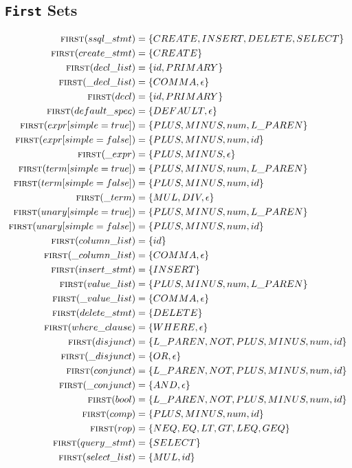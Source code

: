 \documentclass{article}
\begin{document}
\subsection{\texttt{First} Sets}
\begin{align*}
\textsc{first}(ssql\_stmt) & = \{CREATE, INSERT, DELETE, SELECT\} \\
\textsc{first}(create\_stmt) & = \{CREATE\} \\
\textsc{first}(decl\_list) & = \{id, PRIMARY\} \\
\textsc{first}(\_decl\_list) & = \{COMMA, \epsilon\} \\
\textsc{first}(decl) & = \{id, PRIMARY\} \\
\textsc{first}(default\_spec) & = \{DEFAULT, \epsilon\} \\
\textsc{first}(expr[simple=true]) & = \{PLUS, MINUS, num, L\_PAREN\} \\
\textsc{first}(expr[simple=false]) & = \{PLUS, MINUS, num, id\} \\
\textsc{first}(\_expr) & = \{PLUS, MINUS, \epsilon\} \\
\textsc{first}(term[simple=true]) & = \{PLUS, MINUS, num, L\_PAREN\} \\
\textsc{first}(term[simple=false]) & = \{PLUS, MINUS, num, id\} \\
\textsc{first}(\_term) & = \{MUL, DIV, \epsilon\} \\
\textsc{first}(unary[simple=true]) & = \{PLUS, MINUS, num, L\_PAREN\} \\
\textsc{first}(unary[simple=false]) & = \{PLUS, MINUS, num, id\} \\
\textsc{first}(column\_list) & = \{id\} \\
\textsc{first}(\_column\_list) & = \{COMMA, \epsilon\} \\
\textsc{first}(insert\_stmt) & = \{INSERT\} \\
\textsc{first}(value\_list) & = \{PLUS, MINUS, num, L\_PAREN\} \\
\textsc{first}(\_value\_list) & = \{COMMA, \epsilon\} \\
\textsc{first}(delete\_stmt) & = \{DELETE\} \\
\textsc{first}(where\_clause) & = \{WHERE, \epsilon\} \\
\textsc{first}(disjunct) & = \{L\_PAREN, NOT, PLUS, MINUS, num, id\} \\
\textsc{first}(\_disjunct) & = \{OR, \epsilon\} \\
\textsc{first}(conjunct) & = \{L\_PAREN, NOT, PLUS, MINUS, num, id\} \\
\textsc{first}(\_conjunct) & = \{AND, \epsilon\} \\
\textsc{first}(bool) & = \{L\_PAREN, NOT, PLUS, MINUS, num, id\} \\
\textsc{first}(comp) & = \{PLUS, MINUS, num, id\} \\
\textsc{first}(rop) & = \{NEQ, EQ, LT, GT, LEQ, GEQ\} \\
\textsc{first}(query\_stmt) & = \{SELECT\} \\
\textsc{first}(select\_list) & = \{MUL, id\} \\
\end{align*}
\end{document}
